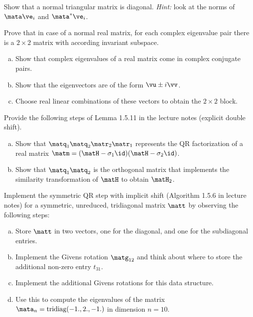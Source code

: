
\begin{Sheet}
  \label{sheet5}

  \begin{Problem}
    Show that a normal triangular matrix is diagonal. \textit{Hint:}
    look at the norms of $\mata \ve_i$ and $\mata^*\ve_i$.
  \end{Problem}

  \begin{Problem}
    Prove that in case of a normal real matrix, for each complex
    eigenvalue pair there is a $2\times 2$ matrix with according
    invariant subspace.
    \begin{enumerate}[(a)]
    \item Show that complex eigenvalues of a real matrix come in
      complex conjugate pairs.
    \item Show that the eigenvectors are of the form $\vu\pm i\vv$.
    \item Choose real linear combinations of these vectors to obtain
      the $2\times 2$ block.
    \end{enumerate}
  \end{Problem}

  \begin{Problem}
    Provide the following steps of Lemma 1.5.11 in the lecture notes
    (explicit double shift).
    \begin{enumerate}[(a)]
    \item Show that $\matq_1\matq_2\matr_2\matr_1$ represents the QR
      factorization of a real matrix
      $\matm = (\matH - \sigma_1\id)(\matH - \sigma_2\id)$.
    \item Show that $\matq_1\matq_2$ is the orthogonal matrix that
      implements the similarity transformation of $\matH$ to obtain
      $\matH_2$.
    \end{enumerate}
  \end{Problem}

  \begin{Problem}[Programming]
    Implement the symmetric QR step with implicit shift (Algorithm
    1.5.6 in lecture notes) for a symmetric, unreduced, tridiagonal
    matrix $\matt$ by observing the following steps:
    \begin{enumerate}[(a)]
    \item Store $\matt$ in two vectors, one for the diagonal, and one
      for the subdiagonal entries.
    \item Implement the Givens rotation $\matg_{12}$ and think about
      where to store the additional non-zero entry $t_{31}$.
    \item Implement the additional Givens rotations for this data
      structure.
    \item Use this to compute the eigenvalues of the matrix
      $\mata_n=\operatorname{tridiag}(-1.,2.,-1.)$ in dimension
      $n=10$.
    \end{enumerate}
  \end{Problem}

\end{Sheet}


